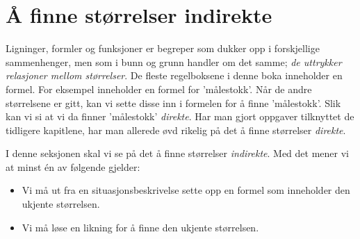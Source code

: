 





\section{Å finne størrelser indirekte}
Ligninger, formler og funksjoner er begreper som dukker opp i forskjellige sammenhenger, men som i bunn og grunn handler om det samme; \textsl{de uttrykker relasjoner mellom størrelser}. De fleste regelboksene i denne boka inneholder en formel. For eksempel inneholder  en formel for 'målestokk'. Når de andre størrelsene er gitt, kan vi sette disse inn i formelen for å finne 'målestokk'. Slik kan vi si at vi da finner 'målestokk' \textsl{direkte}. Har man gjort oppgaver tilknyttet de tidligere kapitlene, har man allerede øvd rikelig på det å finne størrelser \textsl{direkte}.\vsk

I denne seksjonen skal vi se på det å finne størrelser \textsl{indirekte}. Med det mener vi at minst én av følgende gjelder:
\begin{itemize}
	\item Vi må ut fra en situasjonsbeskrivelse sette opp en formel som inneholder den ukjente størrelsen.
	\item Vi må løse en likning for å finne den ukjente størrelsen.
\end{itemize}


